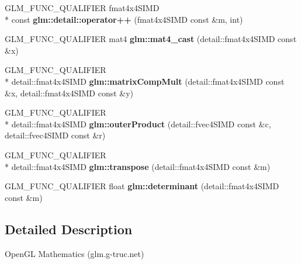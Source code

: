 \begin{DoxyCompactItemize}
\item 
\hypertarget{namespaceglm_1_1detail_afef703ea9bc24f3b3abbcc36e5ef65bb}{G\-L\-M\-\_\-\-F\-U\-N\-C\-\_\-\-Q\-U\-A\-L\-I\-F\-I\-E\-R fmat4x4\-S\-I\-M\-D \\*
const {\bfseries glm\-::detail\-::operator++} (fmat4x4\-S\-I\-M\-D const \&m, int)}\label{namespaceglm_1_1detail_afef703ea9bc24f3b3abbcc36e5ef65bb}

\item 
\hypertarget{namespaceglm_aaea24a8e252f68832f4d368be2035889}{G\-L\-M\-\_\-\-F\-U\-N\-C\-\_\-\-Q\-U\-A\-L\-I\-F\-I\-E\-R mat4 {\bfseries glm\-::mat4\-\_\-cast} (detail\-::fmat4x4\-S\-I\-M\-D const \&x)}\label{namespaceglm_aaea24a8e252f68832f4d368be2035889}

\item 
\hypertarget{namespaceglm_a3f8b69f9fddfae106e1a18ad66a17a1a}{G\-L\-M\-\_\-\-F\-U\-N\-C\-\_\-\-Q\-U\-A\-L\-I\-F\-I\-E\-R \\*
detail\-::fmat4x4\-S\-I\-M\-D {\bfseries glm\-::matrix\-Comp\-Mult} (detail\-::fmat4x4\-S\-I\-M\-D const \&x, detail\-::fmat4x4\-S\-I\-M\-D const \&y)}\label{namespaceglm_a3f8b69f9fddfae106e1a18ad66a17a1a}

\item 
\hypertarget{namespaceglm_a24beb25b08989724431540bb9279937c}{G\-L\-M\-\_\-\-F\-U\-N\-C\-\_\-\-Q\-U\-A\-L\-I\-F\-I\-E\-R \\*
detail\-::fmat4x4\-S\-I\-M\-D {\bfseries glm\-::outer\-Product} (detail\-::fvec4\-S\-I\-M\-D const \&c, detail\-::fvec4\-S\-I\-M\-D const \&r)}\label{namespaceglm_a24beb25b08989724431540bb9279937c}

\item 
\hypertarget{namespaceglm_a8a85a6f79193f0789bd2ed17802b70f6}{G\-L\-M\-\_\-\-F\-U\-N\-C\-\_\-\-Q\-U\-A\-L\-I\-F\-I\-E\-R \\*
detail\-::fmat4x4\-S\-I\-M\-D {\bfseries glm\-::transpose} (detail\-::fmat4x4\-S\-I\-M\-D const \&m)}\label{namespaceglm_a8a85a6f79193f0789bd2ed17802b70f6}

\item 
\hypertarget{namespaceglm_a3d33b661dfd45c27b41440cd02605c05}{G\-L\-M\-\_\-\-F\-U\-N\-C\-\_\-\-Q\-U\-A\-L\-I\-F\-I\-E\-R float {\bfseries glm\-::determinant} (detail\-::fmat4x4\-S\-I\-M\-D const \&m)}\label{namespaceglm_a3d33b661dfd45c27b41440cd02605c05}

\end{DoxyCompactItemize}


\subsection{Detailed Description}
Open\-G\-L Mathematics (glm.\-g-\/truc.\-net)

